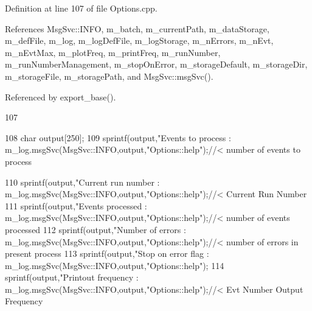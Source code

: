 Definition at line 107 of file Options.cpp.

References MsgSvc::INFO, m\_\-batch, m\_\-currentPath, m\_\-dataStorage, m\_\-defFile, m\_\-log, m\_\-logDefFile, m\_\-logStorage, m\_\-nErrors, m\_\-nEvt, m\_\-nEvtMax, m\_\-plotFreq, m\_\-printFreq, m\_\-runNumber, m\_\-runNumberManagement, m\_\-stopOnError, m\_\-storageDefault, m\_\-storageDir, m\_\-storageFile, m\_\-storagePath, and MsgSvc::msgSvc().

Referenced by export\_\-base().


\begin{DoxyCode}
107                    {
108   char output[250];
109   sprintf(output,"Events to process           : %
      m_log.msgSvc(MsgSvc::INFO,output,"Options::help");//< number of events to process
      
110   sprintf(output,"Current run number          : %
      m_log.msgSvc(MsgSvc::INFO,output,"Options::help");//< Current Run Number
111   sprintf(output,"Events processed            : %
      m_log.msgSvc(MsgSvc::INFO,output,"Options::help");//< number of events processed
112   sprintf(output,"Number of errors            : %
      m_log.msgSvc(MsgSvc::INFO,output,"Options::help");//< number of errors in present
       process
113   sprintf(output,"Stop on error flag          : %
      m_log.msgSvc(MsgSvc::INFO,output,"Options::help");
114   sprintf(output,"Printout frequency          : %
      m_log.msgSvc(MsgSvc::INFO,output,"Options::help");//< Evt Number Output Frequency
      
}
\end{DoxyCode}
